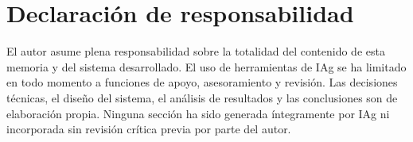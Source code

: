 \documentclass{memoriaPFC}
\begin{document}
\section*{Declaración de responsabilidad}

El autor asume plena responsabilidad sobre la totalidad del contenido de esta memoria
y del sistema desarrollado. El uso de herramientas de IAg se ha limitado en todo
momento a funciones de apoyo, asesoramiento y revisión. Las decisiones técnicas,
el diseño del sistema, el análisis de resultados y las conclusiones son de elaboración
propia. Ninguna sección ha sido generada íntegramente por IAg ni incorporada sin
revisión crítica previa por parte del autor.
\end{document}
